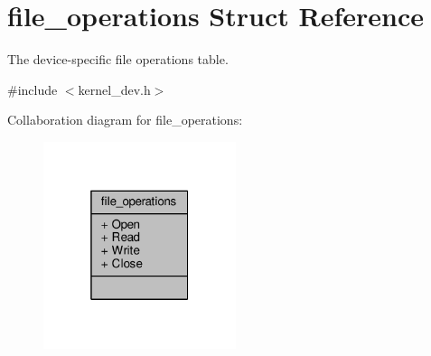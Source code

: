 \hypertarget{structfile__operations}{\section{file\-\_\-operations Struct Reference}
\label{structfile__operations}
}


The device-\/specific file operations table.  




{\ttfamily \#include $<$kernel\-\_\-dev.\-h$>$}



Collaboration diagram for file\-\_\-operations\-:
\nopagebreak
\begin{figure}[H]
\begin{center}
\leavevmode
\includegraphics[width=160pt]{structfile__operations__coll__graph}
\end{center}
\end{figure}
